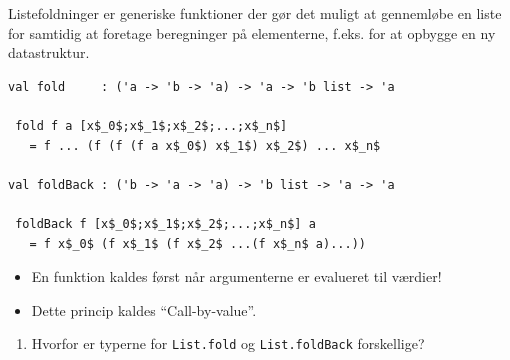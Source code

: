 \documentclass[rgb]{beamer}
\begin{document}
\begin{frame}[fragile]
\begin{footnotesize}


  \vspace{1ex}

  Listefoldninger er generiske funktioner der gør det muligt at
  gennemløbe en liste for samtidig at foretage beregninger på
  elementerne, f.eks. for at opbygge en ny datastruktur.

  \vspace{1ex}

\begin{lstlisting}[numbers=none,frame=none,mathescape]
val fold     : ('a -> 'b -> 'a) -> 'a -> 'b list -> 'a

 fold f a [x$_0$;x$_1$;x$_2$;...;x$_n$]
   = f ... (f (f (f a x$_0$) x$_1$) x$_2$) ... x$_n$

val foldBack : ('b -> 'a -> 'a) -> 'b list -> 'a -> 'a

 foldBack f [x$_0$;x$_1$;x$_2$;...;x$_n$] a
   = f x$_0$ (f x$_1$ (f x$_2$ ...(f x$_n$ a)...))
\end{lstlisting}

\begin{itemize}
\item En funktion kaldes først når argumenterne er evalueret til værdier!
\item Dette princip kaldes ``Call-by-value''.
\end{itemize}

\begin{enumerate}
\item Hvorfor er typerne for \lstinline{List.fold} og \lstinline{List.foldBack} forskellige?
\end{enumerate}

\end{footnotesize}
\end{frame}
\end{document}

